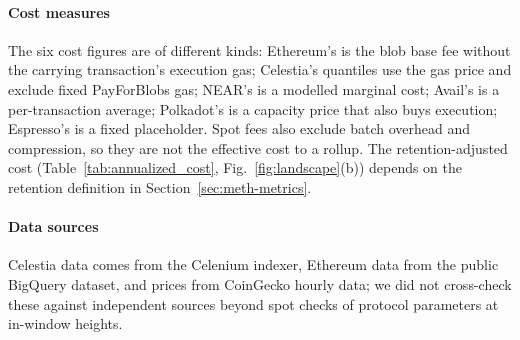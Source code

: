 \paragraph{Cost measures}
The six cost figures are of different kinds: Ethereum's is the blob base fee without the carrying transaction's execution gas; Celestia's quantiles use the gas price and exclude fixed PayForBlobs gas; NEAR's is a modelled marginal cost; Avail's is a per-transaction average; Polkadot's is a capacity price that also buys execution; Espresso's is a fixed placeholder. Spot fees also exclude batch overhead and compression, so they are not the effective cost to a rollup. The retention-adjusted cost (Table~\ref{tab:annualized_cost}, Fig.~\ref{fig:landscape}(b)) depends on the retention definition in Section~\ref{sec:meth-metrics}.

\paragraph{Data sources}
Celestia data comes from the Celenium indexer, Ethereum data from the public BigQuery dataset, and prices from CoinGecko hourly data; we did not cross-check these against independent sources beyond spot checks of protocol parameters at in-window heights.

